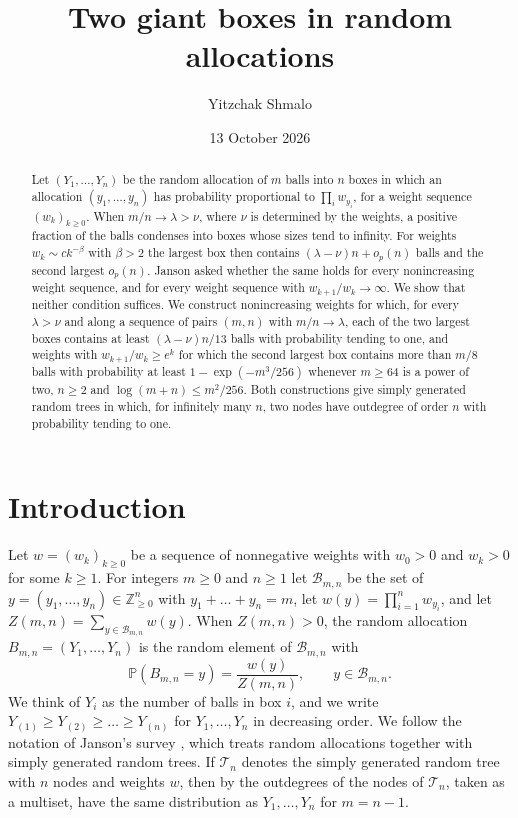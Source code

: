 \documentclass[11pt]{amsart}
\title[Two giant boxes in random allocations]{Two giant boxes in random allocations}
\author{Yitzchak Shmalo}
\date{13 October 2026}
\theoremstyle{remark}
\numberwithin{equation}{section}
\newcommand{\Pp}{\mathbb P}
\newcommand{\Z}{\mathbb Z}
\newcommand{\cB}{\mathcal B}
\newcommand{\cT}{\mathcal T}
\begin{document}
\begin{abstract}
Let $(Y_1,\dots,Y_n)$ be the random allocation of $m$ balls into $n$ boxes in which an allocation $(y_1,\dots,y_n)$ has probability proportional to $\prod_iw_{y_i}$, for a weight sequence $(w_k)_{k\ge0}$. When $m/n\to\lambda>\nu$, where $\nu$ is determined by the weights, a positive fraction of the balls condenses into boxes whose sizes tend to infinity. For weights $w_k\sim ck^{-\beta}$ with $\beta>2$ the largest box then contains $(\lambda-\nu)n+o_p(n)$ balls and the second largest $o_p(n)$. Janson asked whether the same holds for every nonincreasing weight sequence, and for every weight sequence with $w_{k+1}/w_k\to\infty$. We show that neither condition suffices. We construct nonincreasing weights for which, for every $\lambda>\nu$ and along a sequence of pairs $(m,n)$ with $m/n\to\lambda$, each of the two largest boxes contains at least $(\lambda-\nu)n/13$ balls with probability tending to one, and weights with $w_{k+1}/w_k\ge e^k$ for which the second largest box contains more than $m/8$ balls with probability at least $1-\exp(-m^3/256)$ whenever $m\ge64$ is a power of two, $n\ge2$ and $\log(m+n)\le m^2/256$. Both constructions give simply generated random trees in which, for infinitely many $n$, two nodes have outdegree of order $n$ with probability tending to one.
\end{abstract}
\maketitle

\section{Introduction}\label{sec:intro}

Let $w=(w_k)_{k\ge0}$ be a sequence of nonnegative weights with $w_0>0$ and $w_k>0$ for some $k\ge1$. For integers $m\ge0$ and $n\ge1$ let $\cB_{m,n}$ be the set of $y=(y_1,\dots,y_n)\in\Z_{\ge0}^n$ with $y_1+\dots+y_n=m$, let $w(y)=\prod_{i=1}^nw_{y_i}$, and let $Z(m,n)=\sum_{y\in\cB_{m,n}}w(y)$. When $Z(m,n)>0$, the random allocation $B_{m,n}=(Y_1,\dots,Y_n)$ is the random element of $\cB_{m,n}$ with
\[
\Pp(B_{m,n}=y)=\frac{w(y)}{Z(m,n)},\qquad y\in\cB_{m,n}.
\]
We think of $Y_i$ as the number of balls in box $i$, and we write $Y_{(1)}\ge Y_{(2)}\ge\dots\ge Y_{(n)}$ for $Y_1,\dots,Y_n$ in decreasing order. We follow the notation of Janson's survey \cite{J12}, which treats random allocations together with simply generated random trees. If $\cT_n$ denotes the simply generated random tree with $n$ nodes and weights $w$, then by \cite[Lemma~17.1]{J12} the outdegrees of the nodes of $\cT_n$, taken as a multiset, have the same distribution as $Y_1,\dots,Y_n$ for $m=n-1$.
\end{document}
